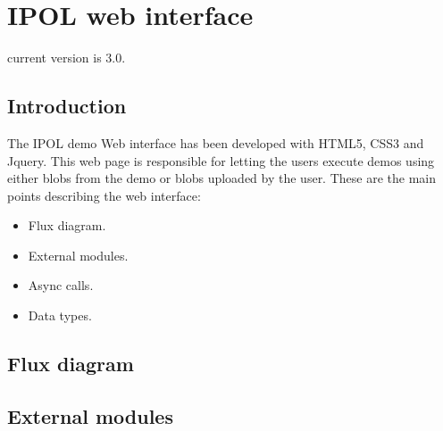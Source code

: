 
\section{IPOL web interface}

current version is 3.0.

\subsection{Introduction}
The IPOL demo Web interface has been developed with HTML5, CSS3 and Jquery. 
This web page is responsible for letting the users execute demos using either blobs 
from the demo or blobs uploaded by the user.
These are the main points describing the web interface:
\begin{itemize}
  \item Flux diagram.
  \item External modules.
  \item Async calls.
  \item Data types.
\end{itemize}


\subsection{Flux diagram}



\subsection{External modules}
\subsection{}